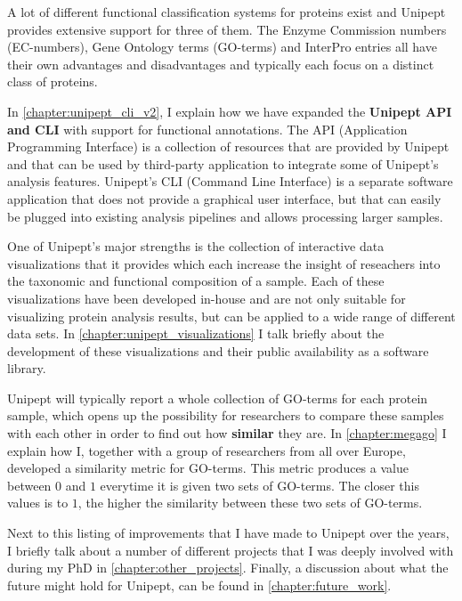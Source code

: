 A lot of different functional classification systems for proteins exist and Unipept provides extensive support for three of them.
The Enzyme Commission numbers (EC-numbers), Gene Ontology terms (GO-terms) and InterPro entries all have their own advantages and disadvantages and typically each focus on a distinct class of proteins.

In \autoref{chapter:unipept_cli_v2}, I explain how we have expanded the \textbf{Unipept API and CLI} with support for functional annotations.
The API (Application Programming Interface) is a collection of resources that are provided by Unipept and that can be used by third-party application to integrate some of Unipept's analysis features.
Unipept's CLI (Command Line Interface) is a separate software application that does not provide a graphical user interface, but that can easily be plugged into existing analysis pipelines and allows processing larger samples.

One of Unipept's major strengths is the collection of interactive data visualizations that it provides which each increase the insight of reseachers into the taxonomic and functional composition of a sample.
Each of these visualizations have been developed in-house and are not only suitable for visualizing protein analysis results, but can be applied to a wide range of different data sets.
In \autoref{chapter:unipept_visualizations} I talk briefly about the development of these visualizations and their public availability as a software library.

Unipept will typically report a whole collection of GO-terms for each protein sample, which opens up the possibility for researchers to compare these samples with each other in order to find out how \textbf{similar} they are.
In \autoref{chapter:megago} I explain how I, together with a group of researchers from all over Europe, developed a similarity metric for GO-terms.
This metric produces a value between $0$ and $1$ everytime it is given two sets of GO-terms.
The closer this values is to $1$, the higher the similarity between these two sets of GO-terms.

Next to this listing of improvements that I have made to Unipept over the years, I briefly talk about a number of different projects that I was deeply involved with during my PhD in \autoref{chapter:other_projects}.
Finally, a discussion about what the future might hold for Unipept, can be found in \autoref{chapter:future_work}.
